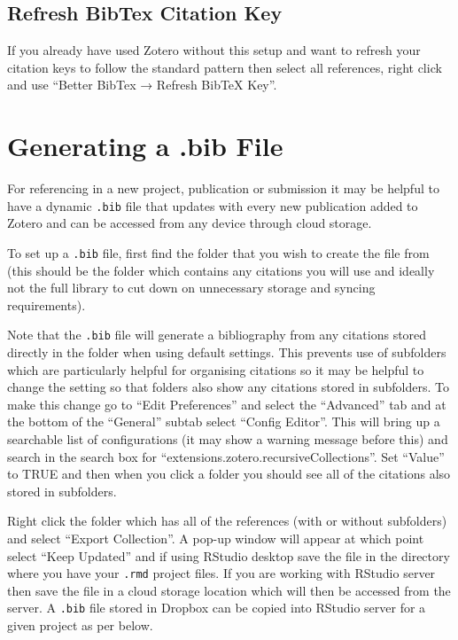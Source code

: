 \documentclass[
]{book}
\begin{document}
\hypertarget{refresh-bibtex-citation-key}{%
\subsection{Refresh BibTex Citation Key}\label{refresh-bibtex-citation-key}}

If you already have used Zotero without this setup and want to refresh your citation keys to follow the standard pattern then select all references, right click and use ``Better BibTex → Refresh BibTeX Key''.

\hypertarget{generating-a-.bib-file}{%
\section{Generating a .bib File}\label{generating-a-.bib-file}}

For referencing in a new project, publication or submission it may be helpful to have a dynamic \texttt{.bib} file that updates with every new publication added to Zotero and can be accessed from any device through cloud storage.

To set up a \texttt{.bib} file, first find the folder that you wish to create the file from (this should be the folder which contains any citations you will use and ideally not the full library to cut down on unnecessary storage and syncing requirements).

Note that the \texttt{.bib} file will generate a bibliography from any citations stored directly in the folder when using default settings. This prevents use of subfolders which are particularly helpful for organising citations so it may be helpful to change the setting so that folders also show any citations stored in subfolders. To make this change go to ``Edit Preferences'' and select the ``Advanced'' tab and at the bottom of the ``General'' subtab select ``Config Editor''. This will bring up a searchable list of configurations (it may show a warning message before this) and search in the search box for ``extensions.zotero.recursiveCollections''. Set ``Value'' to TRUE and then when you click a folder you should see all of the citations also stored in subfolders.

Right click the folder which has all of the references (with or without subfolders) and select ``Export Collection''. A pop-up window will appear at which point select ``Keep Updated'' and if using RStudio desktop save the file in the directory where you have your \texttt{.rmd} project files. If you are working with RStudio server then save the file in a cloud storage location which will then be accessed from the server. A \texttt{.bib} file stored in Dropbox can be copied into RStudio server for a given project as per below.
\end{document}

